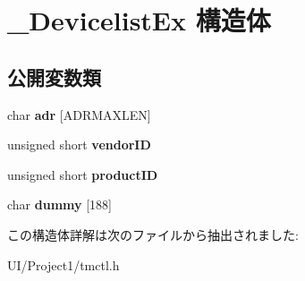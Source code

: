 \hypertarget{struct___devicelist_ex}{}\section{\+\_\+\+Devicelist\+Ex 構造体}
\label{struct___devicelist_ex}
\subsection*{公開変数類}
\begin{DoxyCompactItemize}
\item 
\mbox{\label{struct___devicelist_ex_a55f7e0697a1e58d416aa850c6ea0d714}} 
char {\bfseries adr} \mbox{[}A\+D\+R\+M\+A\+X\+L\+EN\mbox{]}
\item 
\mbox{\label{struct___devicelist_ex_a317a5a5f731db982846589f5ad4f7a03}} 
unsigned short {\bfseries vendor\+ID}
\item 
\mbox{\label{struct___devicelist_ex_a38a0533aaba6b8dc583d90363f351481}} 
unsigned short {\bfseries product\+ID}
\item 
\mbox{\label{struct___devicelist_ex_a0105c187ba3ff2943e32c9f040d7d6fc}} 
char {\bfseries dummy} \mbox{[}188\mbox{]}
\end{DoxyCompactItemize}


この構造体詳解は次のファイルから抽出されました\+:\begin{DoxyCompactItemize}
\item 
U\+I/\+Project1/tmctl.\+h\end{DoxyCompactItemize}
